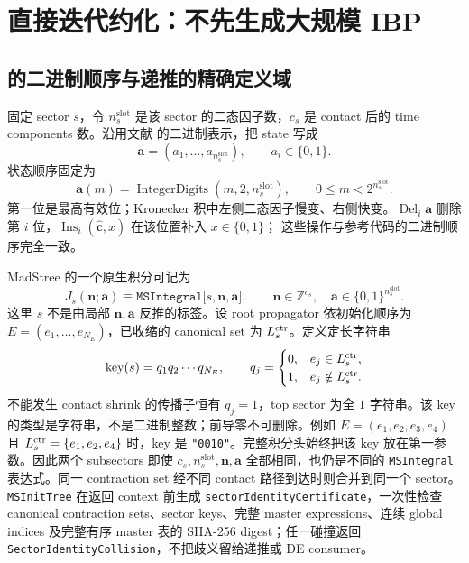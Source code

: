 \documentclass[11pt,a4paper]{ctexart}
\begin{document}
\section{直接迭代约化：不先生成大规模 IBP}
\label{sec:direct-reduction}

\subsection{\texorpdfstring{\cite{Chen:2023eic}}{arXiv:2401.00129} 的二进制顺序与递推的精确定义域}

固定 sector $s$，令 $n_s^{\mathrm{slot}}$ 是该 sector 的二态因子数，$c_s$ 是 contact 后的 time components 数。沿用文献 \cite{Chen:2023eic} 的二进制表示，把 state 写成
\begin{equation}
 \bm a=(a_1,\ldots,a_{n_s^{\mathrm{slot}}}),
 \qquad a_i\in\{0,1\}.
\end{equation}
状态顺序固定为
\begin{equation}
 \bm a(m)=\operatorname{IntegerDigits}(m,2,n_s^{\mathrm{slot}}),
 \qquad 0\leq m<2^{n_s^{\mathrm{slot}}}.
 \label{eq:binary-state-order}
\end{equation}
第一位是最高有效位；Kronecker 积中左侧二态因子慢变、右侧快变。$\operatorname{Del}_i\bm a$
删除第 $i$ 位，$\operatorname{Ins}_i(\widehat{\bm c},x)$ 在该位置补入 $x\in\{0,1\}$；
这些操作与参考代码的二进制顺序完全一致。

MadStree 的一个原生积分可记为
\begin{equation}
 J_s(\bm n;\bm a)
 \equiv\texttt{MSIntegral[}s,\bm n,\bm a\texttt{]},
 \qquad
 \bm n\in\mathbb Z^{c_s},
 \quad
 \bm a\in\{0,1\}^{n_s^{\mathrm{slot}}}.
 \label{eq:MSIntegral-domain}
\end{equation}
这里 $s$ 不是由局部 $\bm n,\bm a$ 反推的标签。设 root propagator 依初始化顺序为
$E=(e_1,\ldots,e_{N_E})$，已收缩的 canonical set 为 $L_s^{\rm ctr}$。定义定长字符串
\begin{equation}
 \operatorname{key}(s)=q_1q_2\cdots q_{N_E},\qquad
 q_j=\begin{cases}0,&e_j\in L_s^{\rm ctr},\\1,&e_j\notin L_s^{\rm ctr}.
 \end{cases}
 \label{eq:sector-bit-string-key}
\end{equation}
不能发生 contact shrink 的传播子恒有 $q_j=1$，top sector 为全 $1$ 字符串。该 key 的类型是字符串，不是二进制整数；前导零不可删除。例如 $E=(e_1,e_2,e_3,e_4)$ 且 $L_s^{\rm ctr}=\{e_1,e_2,e_4\}$ 时，key 是 \texttt{"0010"}。完整积分头始终把该 key 放在第一参数。因此两个 subsectors 即使 $c_s,n_s^{\mathrm{slot}},\bm n,\bm a$ 全部相同，也仍是不同的
\texttt{MSIntegral} 表达式。同一 contraction set 经不同 contact 路径到达时则合并到同一个 sector。\texttt{MSInitTree} 在返回 context 前生成
\texttt{sectorIdentityCertificate}，一次性检查 canonical contraction sets、sector keys、完整 master expressions、连续 global indices 及完整有序 master 表的 SHA-256 digest；任一碰撞返回
\texttt{SectorIdentityCollision}，不把歧义留给递推或 DE consumer。
\end{document}
